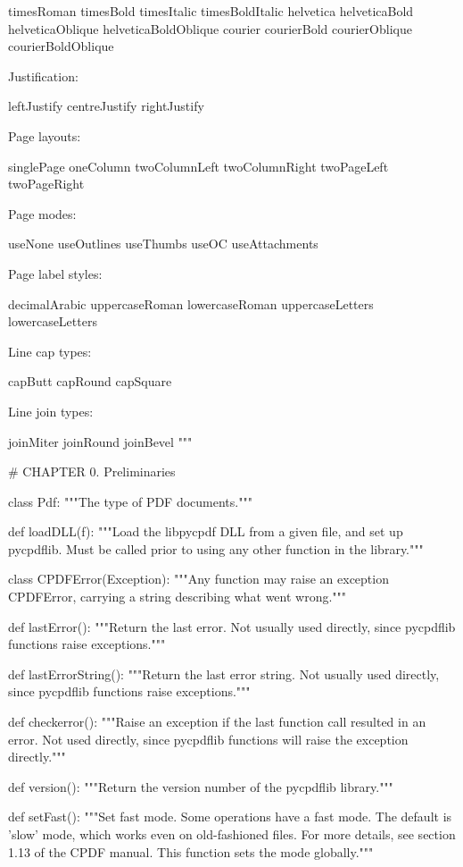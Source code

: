 timesRoman timesBold timesItalic timesBoldItalic helvetica helveticaBold
helveticaOblique helveticaBoldOblique courier courierBold courierOblique
courierBoldOblique

Justification:

leftJustify centreJustify rightJustify

Page layouts:

singlePage oneColumn twoColumnLeft twoColumnRight twoPageLeft twoPageRight

Page modes:

useNone useOutlines useThumbs useOC useAttachments

Page label styles:

decimalArabic uppercaseRoman lowercaseRoman uppercaseLetters lowercaseLetters

Line cap types:

capButt capRound capSquare

Line join types:

joinMiter joinRound joinBevel
"""

# CHAPTER 0. Preliminaries

class Pdf:
    """The type of PDF documents."""

def loadDLL(f):
    """Load the libpycpdf DLL from a given file, and set up pycpdflib. Must be
    called prior to using any other function in the library."""

class CPDFError(Exception):
    """Any function may raise an exception CPDFError, carrying a string
    describing what went wrong."""

def lastError():
    """Return the last error. Not usually used directly, since pycpdflib
    functions raise exceptions."""

def lastErrorString():
    """Return the last error string. Not usually used directly, since pycpdflib
    functions raise exceptions."""

def checkerror():
    """Raise an exception if the last function call resulted in an error. Not
    used directly, since pycpdflib functions will raise the exception
    directly."""

def version():
    """Return the version number of the pycpdflib library."""

def setFast():
    """Set fast mode. Some operations have a fast mode. The default is 'slow'
    mode, which works even on old-fashioned files. For more details, see
    section 1.13 of the CPDF manual. This function sets the mode globally."""

